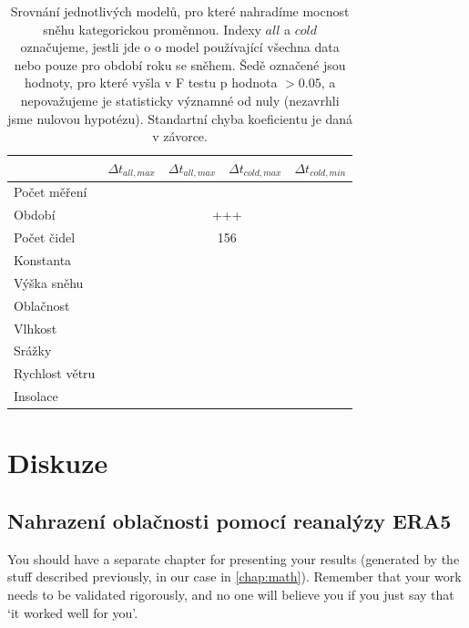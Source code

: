 \begin{table}
\centering\footnotesize\sf
\begin{tabular}{lrrrr}
\toprule
	& $\Delta t_{all,max}$ & $\Delta t_{all,max}$ & $\Delta t_{cold,max}$ & $\Delta t_{cold,min}$\\
\midrule
	Počet měření &  & &  & \\
	Období & \multicolumn{4}{c}{+++} \\
	Počet čidel & \multicolumn{4}{c}{156} \\
\midrule
	Konstanta & $\SI{}{}$ & $\SI{}{}$ & $\SI{}{}$ & $\SI{}{}$\\
	Výška sněhu & $\SI{}{}$ & $\SI{}{}$ & $\SI{}{}$ & $\SI{}{}$\\
	Oblačnost & $\SI{}{}$ & $\SI{}{}$ & $\SI{}{}$ & $\SI{}{}$\\
	Vlhkost & $\SI{}{}$ & $\SI{}{}$ & $\SI{}{}$ & $\SI{}{}$\\
	Srážky & $\SI{}{}$ & $\SI{}{}$ & $\SI{}{}$ & $\SI{}{}$\\
	Rychlost větru & $\SI{}{}$ & $\SI{}{}$ & $\SI{}{}$ & $\SI{}{}$\\
	Insolace & $\SI{}{}$ & $\SI{}{}$ & $\SI{}{}$ & $\SI{}{}$\\
\bottomrule
\end{tabular}
	\caption{Srovnání jednotlivých modelů, pro které nahradíme mocnost sněhu kategorickou proměnnou. Indexy $all$ a $cold$ označujeme, jestli jde o o model používající všechna data nebo pouze pro období roku se sněhem. Šedě označené jsou hodnoty, pro které vyšla v F testu p hodnota $>0.05$, a nepovažujeme je statisticky významné od nuly (nezavrhli jsme nulovou hypotézu). Standartní chyba koeficientu je daná v závorce.}
	\label{tab:snowcategoricalmodels}
\end{table}

\section{Diskuze}

\subsection{Nahrazení oblačnosti pomocí reanalýzy ERA5}

You should have a separate chapter for presenting your results (generated by the stuff described previously, in our case in \cref{chap:math}). Remember that your work needs to be validated rigorously, and no one will believe you if you just say that `it worked well for you'.

